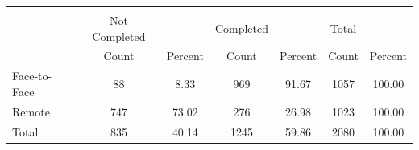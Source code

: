 {
\def\sym#1{\ifmmode^{#1}\else\(^{#1}\)\fi}
\begin{tabular}{l*{3}{cc}}
\hline\hline
            &\multicolumn{6}{c}{}                                                                           \\
            &  Not Completed&               &      Completed&               &          Total&               \\
            &          Count&        Percent&          Count&        Percent&          Count&        Percent\\
\hline
Face-to-Face&             88&           8.33&            969&          91.67&           1057&         100.00\\
Remote      &            747&          73.02&            276&          26.98&           1023&         100.00\\
Total       &            835&          40.14&           1245&          59.86&           2080&         100.00\\
\hline\hline
\end{tabular}
}
